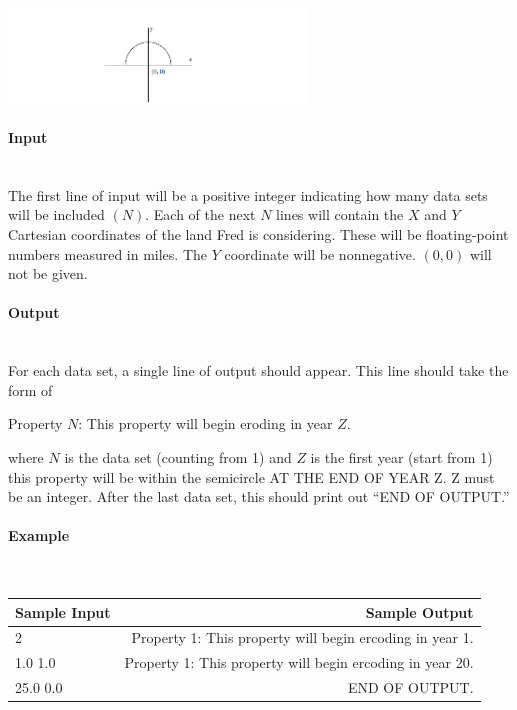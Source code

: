 \documentclass{article}
\begin{document}
\begin{center}
        \includegraphics[width=0.6\textwidth]{Figures/03.png}
\end{center}

\paragraph{Input} \mbox{} \\

The first line of input will be a positive integer indicating how many data sets will be included $(N)$. Each of the next $N$ lines will contain the $X$ and $Y$ Cartesian coordinates of the land Fred is considering. These will be floating-point numbers measured in miles. The $Y$ coordinate will be
nonnegative. $(0, 0)$ will not be given.

\paragraph{Output}\mbox{} \\

For each data set, a single line of output should appear. This line should take the form of

\begin{center} Property $N$: This property will begin eroding in year $Z$.
\end{center}
where $N$ is the data set (counting from 1) and $Z$ is the first year (start from 1) this property will be within the semicircle AT THE END OF YEAR Z. Z must be an integer. After the last data set,
this should print out “END OF OUTPUT.”


\paragraph{Example}\mbox{} \\

\begin{table}[h]
    \centering
    \begin{tabular}{|l|r|}
        \hline
        \textbf{Sample Input} & \textbf{Sample Output} \\
        \hline
           2 & Property 1: This property will begin ercoding in year 1.  \\ 
           1.0 1.0 & Property 1: This property will begin ercoding in year 20. \\ 
           25.0 0.0 & END OF OUTPUT. \\  \hline
    \end{tabular}
\end{table}
\end{document}
